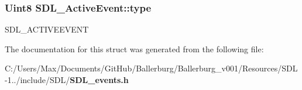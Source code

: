 \subsubsection[{type}]{\setlength{\rightskip}{0pt plus 5cm}Uint8 S\+D\+L\+\_\+\+Active\+Event\+::type}\label{struct_s_d_l___active_event_a4a719c0224f4c0079043432f540621c4}
S\+D\+L\+\_\+\+A\+C\+T\+I\+V\+E\+E\+V\+E\+N\+T 

The documentation for this struct was generated from the following file\+:\begin{DoxyCompactItemize}
\item 
C\+:/\+Users/\+Max/\+Documents/\+Git\+Hub/\+Ballerburg/\+Ballerburg\+\_\+v001/\+Resources/\+S\+D\+L-\/1../include/\+S\+D\+L/{\bf S\+D\+L\+\_\+events.\+h}\end{DoxyCompactItemize}
